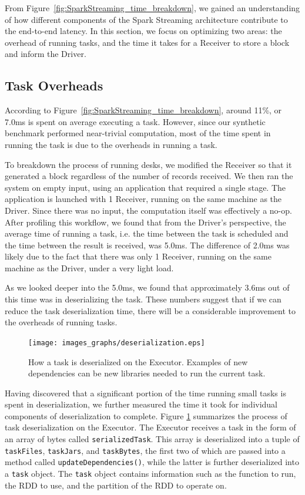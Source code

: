 From Figure~\ref{fig:SparkStreaming_time_breakdown}, we gained an understanding of how different components of the Spark Streaming architecture contribute to the end-to-end latency. In this section, we focus on optimizing two areas: the overhead of running tasks, and the time it takes for a Receiver to store a block and inform the Driver.

\subsection{Task Overheads}
According to Figure~\ref{fig:SparkStreaming_time_breakdown}, around 11\%, or 7.0ms is spent on average executing a task. However, since our synthetic benchmark performed near-trivial computation, most of the time spent in running the task is due to the overheads in running a task. 

To breakdown the process of running desks, we modified the Receiver so that it generated a block regardless of the number of records received. We then ran the system on empty input, using an application that required a single stage. The application is launched with 1 Receiver, running on the same machine as the Driver. Since there was no input, the computation itself was effectively a no-op. After profiling this workflow, we found that from the Driver's perspective, the average time of running a task, i.e. the time between the task is scheduled and the time between the result is received, was 5.0ms. The difference of 2.0ms was likely due to the fact that there was only 1 Receiver, running on the same machine as the Driver, under a very light load.

As we looked deeper into the 5.0ms, we found that approximately 3.6ms out of this time was in deserializing the task. These numbers suggest that if we can reduce the task deserialization time, there will be a considerable improvement to the overheads of running tasks.

\begin{figure}[t!]
 \begin{center}
   \texttt{[image: images\_graphs/deserialization.eps]}
 \end{center}
 \caption{How a task is deserialized on the Executor. Examples of new dependencies can be new libraries needed to run the current task.}
 \label{fig:deserialization}
\end{figure}

Having discovered that a significant portion of the time running small tasks is spent in deserialization, we further measured the time it took for individual components of deserialization to complete. Figure \ref{fig:deserialization} summarizes the process of task deserialization on the Executor. The Executor receives a task in the form of an array of bytes called \texttt{serializedTask}. This array is deserialized into a tuple of \texttt{taskFiles}, \texttt{taskJars}, and \texttt{taskBytes}, the first two of which are passed into a method called \texttt{updateDependencies()}, while the latter is further deserialized into a \texttt{task} object. The \texttt{task} object contains information such as the function to run, the RDD to use, and the partition of the RDD to operate on.

